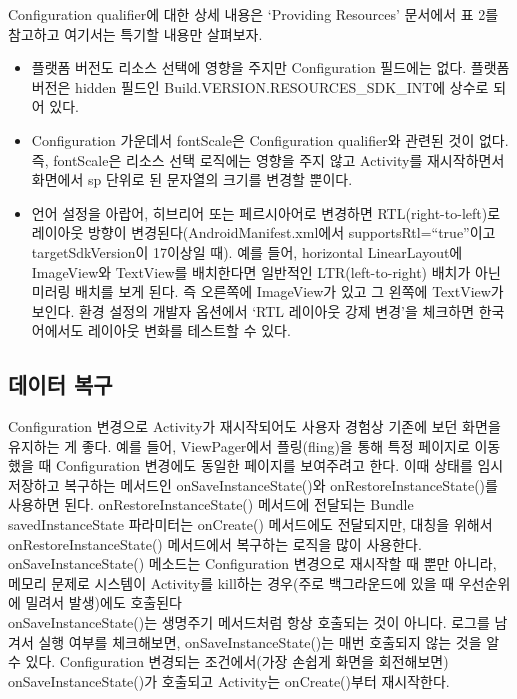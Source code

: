 Configuration qualifier에 대한 상세 내용은 `Providing Resources' 문서에서 표 2를 참고하고 여기서는 특기할 내용만 살펴보자.
\begin{itemize}
\item 플랫폼 버전도 리소스 선택에 영향을 주지만  Configuration 필드에는 없다. 
플랫폼 버전은 hidden 필드인 Build.VERSION.RESOURCES\_SDK\_INT에 상수로 되어 있다. 

\item Configuration 가운데서 fontScale은 Configuration qualifier와 관련된 것이 없다. 
즉, fontScale은 리소스 선택 로직에는 영향을 주지 않고 Activity를 재시작하면서 화면에서 sp 단위로 된 문자열의 크기를 변경할 뿐이다.

\item 언어 설정을 아랍어, 히브리어 또는 페르시아어로 변경하면 RTL(right-to-left)로 레이아웃 방향이 변경된다(AndroidManifest.xml에서 supportsRtl=``true''이고 targetSdkVersion이 17이상일 때). 
예를 들어, horizontal LinearLayout에 ImageView와 TextView를 배치한다면 일반적인 LTR(left-to-right) 배치가 아닌 미러링 배치를 보게 된다. 
즉 오른쪽에 ImageView가 있고 그 왼쪽에 TextView가 보인다. 환경 설정의 개발자 옵션에서 `RTL 레이아웃 강제 변경'을 체크하면 한국어에서도 레이아웃 변화를 테스트할 수 있다. 
\end{itemize}

\subsection{데이터 복구}
Configuration 변경으로 Activity가 재시작되어도 사용자 경험상 기존에 보던 화면을 유지하는 게 좋다. 
예를 들어, ViewPager에서 플링(fling)을 통해 특정 페이지로 이동했을 때 Configuration 변경에도 동일한 페이지를 보여주려고 한다. 
이때 상태를 임시 저장하고 복구하는 메서드인 onSaveInstanceState()와 onRestoreInstanceState()를 사용하면 된다. 
onRestoreInstanceState() 메서드에 전달되는 Bundle savedInstanceState 파라미터는 onCreate() 메서드에도 전달되지만, 대칭을 위해서 onRestoreInstanceState() 메서드에서 복구하는 로직을 많이 사용한다.
onSaveInstanceState() 메소드는 Configuration 변경으로 재시작할 때 뿐만 아니라, 메모리 문제로 시스템이 Activity를 kill하는 경우(주로 백그라운드에 있을 때 우선순위에 밀려서 발생)에도 호출된다\\

onSaveInstanceState()는 생명주기 메서드처럼 항상 호출되는 것이 아니다.
로그를 남겨서 실행 여부를 체크해보면, onSaveInstanceState()는 매번 호출되지 않는 것을 알 수 있다. 
Configuration 변경되는 조건에서(가장 손쉽게 화면을 회전해보면) onSaveInstanceState()가 호출되고 Activity는 onCreate()부터 재시작한다.\\

